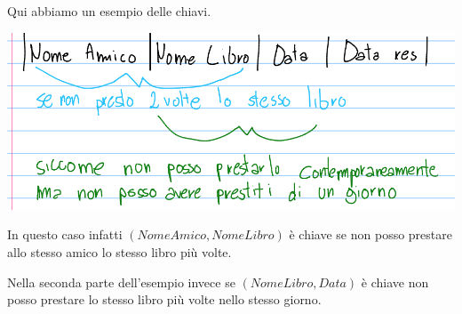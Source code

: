 \begin{exmp}

Qui abbiamo un esempio delle chiavi.

\includegraphics[width=\textwidth]{img/esempio_chiavi.png}

In questo caso infatti $(NomeAmico,NomeLibro)$ è chiave se non posso prestare allo stesso amico lo stesso libro più volte.

Nella seconda parte dell'esempio invece se $(NomeLibro,Data)$ è chiave non posso prestare lo stesso libro più volte nello stesso giorno.
\end{exmp}


